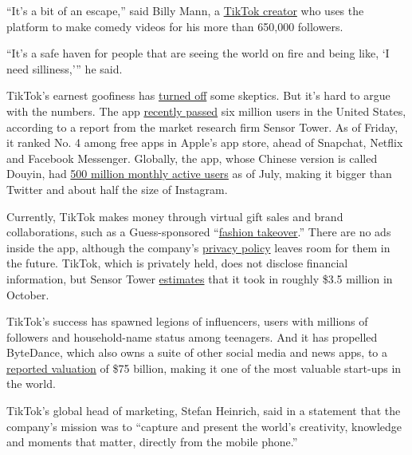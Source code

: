 ``It's a bit of an escape,'' said Billy Mann, a
\href{https://m.tiktok.com/h5/share/usr/160249092609150976.html}{TikTok
creator} who uses the platform to make comedy videos for his more than
650,000 followers.

``It's a safe haven for people that are seeing the world on fire and
being like, `I need silliness,''' he said.

TikTok's earnest goofiness has
\href{https://theoutline.com/post/6383/tiktok-will-never-replace-vine}{turned
off} some skeptics. But it's hard to argue with the numbers. The app
\href{https://www.theverge.com/2018/11/15/18095446/tiktok-jimmy-fallon-tony-hawk-downloads-revenue}{recently
passed} six million users in the United States, according to a report
from the market research firm Sensor Tower. As of Friday, it ranked No.
4 among free apps in Apple's app store, ahead of Snapchat, Netflix and
Facebook Messenger. Globally, the app, whose Chinese version is called
Douyin, had
\href{http://www.chinadaily.com.cn/a/201807/17/WS5b4d6057a310796df4df6e3c.html}{500
million monthly active users} as of July, making it bigger than Twitter
and about half the size of Instagram.

Currently, TikTok makes money through virtual gift sales and brand
collaborations, such as a Guess-sponsored
``\href{https://www.businesswire.com/news/home/20180831005348/en/GUESS-TikTok-Launch-First-of-Its-Kind-Fashion-Partnership}{fashion
takeover}.'' There are no ads inside the app, although the company's
\href{https://www.tiktok.com/i18n/privacy/\#how-use}{privacy policy}
leaves room for them in the future. TikTok, which is privately held,
does not disclose financial information, but Sensor Tower
\href{https://sensortower.com/blog/tiktok-revenue}{estimates} that it
took in roughly \$3.5 million in October.

TikTok's success has spawned legions of influencers, users with millions
of followers and household-name status among teenagers. And it has
propelled ByteDance, which also owns a suite of other social media and
news apps, to a
\href{https://www.nytimes.com/2018/09/28/technology/bytedance-fundraising-toutiao-tiktok.html}{reported
valuation} of \$75 billion, making it one of the most valuable start-ups
in the world.

TikTok's global head of marketing, Stefan Heinrich, said in a statement
that the company's mission was to ``capture and present the world's
creativity, knowledge and moments that matter, directly from the mobile
phone.''

